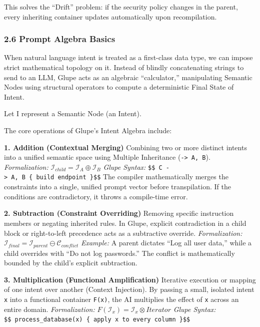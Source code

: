 \documentclass[11pt, a4paper]{article}
\begin{document}
This solves the ``Drift'' problem: if the security policy changes in the
parent, every inheriting container updates automatically upon
recompilation.

\subsubsection{2.6 Prompt Algebra Basics}\label{prompt-algebra-basics}

When natural language intent is treated as a first-class data type, we
can impose strict mathematical topology on it. Instead of blindly
concatenating strings to send to an LLM, Glupe acts as an algebraic
``calculator,'' manipulating Semantic Nodes using structural operators
to compute a deterministic Final State of Intent.

Let I represent a Semantic Node (an Intent).

The core operations of Glupe's Intent Algebra include:

\textbf{1. Addition (Contextual Merging)} Combining two or more distinct
intents into a unified semantic space using Multiple Inheritance
(\texttt{-\textgreater{}\ A,\ B}). \emph{Formalization:}
\(\mathcal{I}_{child} = \mathcal{I}_{A} \oplus \mathcal{I}_{B}\)
\emph{Glupe Syntax:}
\texttt{\$\$\ C\ -\textgreater{}\ A,\ B\ \{\ build\ endpoint\ \}\$\$}
The compiler mathematically merges the constraints into a single,
unified prompt vector before transpilation. If the conditions are
contradictory, it throws a compile-time error.

\textbf{2. Subtraction (Constraint Overriding)} Removing specific
instruction members or negating inherited rules. In Glupe, explicit
contradiction in a child block or right-to-left precedence acts as a
subtractive override. \emph{Formalization:}
\(\mathcal{I}_{final} = \mathcal{I}_{parent} \ominus \mathcal{C}_{conflict}\)
\emph{Example:} A parent dictates ``Log all user data,'' while a child
overrides with ``Do not log passwords.'' The conflict is mathematically
bounded by the child's explicit subtraction.

\textbf{3. Multiplication (Functional Amplification)} Iterative
execution or mapping of one intent over another (Context Injection). By
passing a small, isolated intent \texttt{x} into a functional container
\texttt{F(x)}, the AI multiplies the effect of \texttt{x} across an
entire domain. \emph{Formalization:}
\(F(\mathcal{I}_x) = \mathcal{I}_x \otimes Iterator\) \emph{Glupe
Syntax:}
\texttt{\$\$\ process\_database(x)\ \{\ apply\ x\ to\ every\ column\ \}\$\$}
\end{document}
